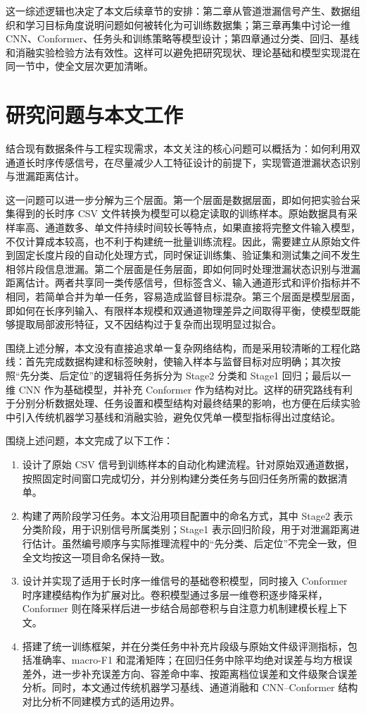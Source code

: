 这一综述逻辑也决定了本文后续章节的安排：第二章从管道泄漏信号产生、数据组织和学习目标角度说明问题如何被转化为可训练数据集；第三章再集中讨论一维 CNN、Conformer、任务头和训练策略等模型设计；第四章通过分类、回归、基线和消融实验检验方法有效性。这样可以避免把研究现状、理论基础和模型实现混在同一节中，使全文层次更加清晰。

\section{研究问题与本文工作}

结合现有数据条件与工程实现需求，本文关注的核心问题可以概括为：如何利用双通道长时序传感信号，在尽量减少人工特征设计的前提下，实现管道泄漏状态识别与泄漏距离估计。

这一问题可以进一步分解为三个层面。第一个层面是数据层面，即如何把实验台采集得到的长时序 CSV 文件转换为模型可以稳定读取的训练样本。原始数据具有采样率高、通道数多、单文件持续时间较长等特点，如果直接将完整文件输入模型，不仅计算成本较高，也不利于构建统一批量训练流程。因此，需要建立从原始文件到固定长度片段的自动化处理方式，同时保证训练集、验证集和测试集之间不发生相邻片段信息泄漏。第二个层面是任务层面，即如何同时处理泄漏状态识别与泄漏距离估计。两者共享同一类传感信号，但标签含义、输入通道形式和评价指标并不相同，若简单合并为单一任务，容易造成监督目标混杂。第三个层面是模型层面，即如何在长序列输入、有限样本规模和双通道物理差异之间取得平衡，使模型既能够提取局部波形特征，又不因结构过于复杂而出现明显过拟合。

围绕上述分解，本文没有直接追求单一复杂网络结构，而是采用较清晰的工程化路线：首先完成数据构建和标签映射，使输入样本与监督目标对应明确；其次按照“先分类、后定位”的逻辑将任务拆分为 Stage2 分类和 Stage1 回归；最后以一维 CNN 作为基础模型，并补充 Conformer 作为结构对比。这样的研究路线有利于分别分析数据处理、任务设置和模型结构对最终结果的影响，也方便在后续实验中引入传统机器学习基线和消融实验，避免仅凭单一模型指标得出过度结论。

围绕上述问题，本文完成了以下工作：

\begin{enumerate}
  \item 设计了原始 CSV 信号到训练样本的自动化构建流程。针对原始双通道数据，按照固定时间窗口完成切分，并分别构建分类任务与回归任务所需的数据清单。
  \item 构建了两阶段学习任务。本文沿用项目配置中的命名方式，其中 Stage2 表示分类阶段，用于识别信号所属类别；Stage1 表示回归阶段，用于对泄漏距离进行估计。虽然编号顺序与实际推理流程中的“先分类、后定位”不完全一致，但全文均按这一项目命名保持一致。
  \item 设计并实现了适用于长时序一维信号的基础卷积模型，同时接入 Conformer 时序建模结构作为扩展对比。卷积模型通过多层一维卷积逐步降采样，Conformer 则在降采样后进一步结合局部卷积与自注意力机制建模长程上下文。
  \item 搭建了统一训练框架，并在分类任务中补充片段级与原始文件级评测指标，包括准确率、macro-F1 和混淆矩阵；在回归任务中除平均绝对误差与均方根误差外，进一步补充误差方向、容差命中率、按距离档位误差和文件级聚合误差分析。同时，本文通过传统机器学习基线、通道消融和 CNN--Conformer 结构对比分析不同建模方式的适用边界。
\end{enumerate}

